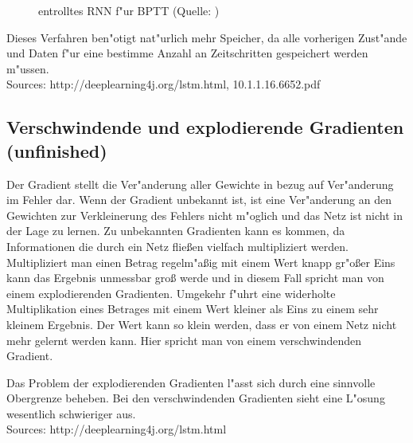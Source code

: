 {\begin{figure}[htp]
\caption[BPTT]{entrolltes RNN f"ur BPTT (Quelle: \cite{BPTT})}
\end{figure}
Dieses Verfahren ben"otigt nat"urlich mehr Speicher, da alle vorherigen Zust"ande und Daten f"ur eine bestimme Anzahl an Zeitschritten gespeichert werden m"ussen.\\
Sources: http://deeplearning4j.org/lstm.html,  10.1.1.16.6652.pdf


\subsection{Verschwindende und explodierende Gradienten (unfinished)}
Der Gradient stellt die Ver"anderung aller Gewichte in bezug auf Ver"anderung im Fehler dar. Wenn der Gradient unbekannt ist, ist eine Ver"anderung an den Gewichten zur Verkleinerung des Fehlers nicht m"oglich und das Netz ist nicht in der Lage zu lernen. Zu unbekannten Gradienten kann es kommen, da Informationen die durch ein Netz flie{\ss}en vielfach multipliziert werden. Multipliziert man einen Betrag regelm"a{\ss}ig mit einem Wert knapp gr"o{\ss}er Eins kann das Ergebnis unmessbar gro{\ss} werde und in diesem Fall spricht man von einem explodierenden Gradienten. Umgekehr f"uhrt eine widerholte Multiplikation eines Betrages mit einem Wert kleiner als Eins zu einem sehr kleinem Ergebnis. Der Wert kann so klein werden, dass er von einem Netz nicht mehr gelernt werden kann. Hier spricht man von einem verschwindenden Gradient.

Das Problem der explodierenden Gradienten l"asst sich durch eine sinnvolle Obergrenze beheben. Bei den verschwindenden Gradienten sieht eine L"osung wesentlich schwieriger aus.\\
Sources: http://deeplearning4j.org/lstm.html


}
